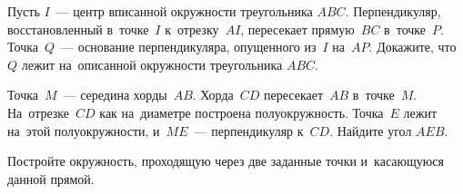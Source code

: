 \begin{problems}
\item
Пусть $I$~--- центр вписанной окружности треугольника $ABC$.
Перпендикуляр, восстановленный в~точке~$I$ к~отрезку~$AI$, пересекает
прямую~$BC$ в~точке~$P$.
Точка~$Q$~--- основание перпендикуляра, опущенного из~$I$ на~$AP$.
Докажите, что $Q$ лежит на~описанной окружности треугольника $ABC$.

\item
Точка~$M$~--- середина хорды~$AB$.
Хорда~$CD$ пересекает~$AB$ в~точке~$M$.
На~отрезке~$CD$ как на~диаметре построена полуокружность.
Точка~$E$ лежит на~этой полуокружности, и~$ME$~--- перпендикуляр к~$CD$.
Найдите угол $AEB$.

\item
Постройте окружность, проходящую через две заданные точки и~касающуюся данной
прямой.

\end{problems}

